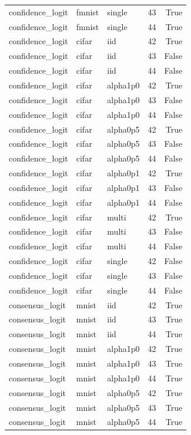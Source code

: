 \begin{tabular}{lllrr}
confidence\_logit & fmnist & single & 43 & True \\
confidence\_logit & fmnist & single & 44 & True \\
confidence\_logit & cifar & iid & 42 & True \\
confidence\_logit & cifar & iid & 43 & False \\
confidence\_logit & cifar & iid & 44 & False \\
confidence\_logit & cifar & alpha1p0 & 42 & True \\
confidence\_logit & cifar & alpha1p0 & 43 & False \\
confidence\_logit & cifar & alpha1p0 & 44 & False \\
confidence\_logit & cifar & alpha0p5 & 42 & True \\
confidence\_logit & cifar & alpha0p5 & 43 & False \\
confidence\_logit & cifar & alpha0p5 & 44 & False \\
confidence\_logit & cifar & alpha0p1 & 42 & True \\
confidence\_logit & cifar & alpha0p1 & 43 & False \\
confidence\_logit & cifar & alpha0p1 & 44 & False \\
confidence\_logit & cifar & multi & 42 & True \\
confidence\_logit & cifar & multi & 43 & False \\
confidence\_logit & cifar & multi & 44 & False \\
confidence\_logit & cifar & single & 42 & False \\
confidence\_logit & cifar & single & 43 & False \\
confidence\_logit & cifar & single & 44 & False \\
consensus\_logit & mnist & iid & 42 & True \\
consensus\_logit & mnist & iid & 43 & True \\
consensus\_logit & mnist & iid & 44 & True \\
consensus\_logit & mnist & alpha1p0 & 42 & True \\
consensus\_logit & mnist & alpha1p0 & 43 & True \\
consensus\_logit & mnist & alpha1p0 & 44 & True \\
consensus\_logit & mnist & alpha0p5 & 42 & True \\
consensus\_logit & mnist & alpha0p5 & 43 & True \\
consensus\_logit & mnist & alpha0p5 & 44 & True \\

\end{tabular}
